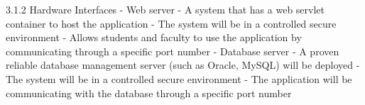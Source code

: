3.1.2 Hardware Interfaces
- Web server
	- A system that has a web servlet container to host the application
	- The system will be in a controlled secure environment 
	- Allows students and faculty to use the application by communicating through a specific port number
- Database server
	- A proven reliable database management server (such as Oracle, MySQL) will be deployed 
	- The system will be in a controlled secure environment 
	- The application will be communicating with the database through a specific port number
